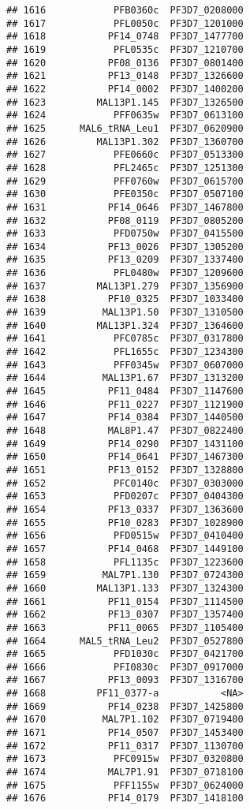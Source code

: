 \documentclass[12pt, a4paper]{article}\usepackage[]{graphicx}\usepackage[]{color}
\makeatletter
\newenvironment{kframe}{%
 \def\at@end@of@kframe{}%
 \ifinner\ifhmode%
  \def\at@end@of@kframe{\end{minipage}}%
  \begin{minipage}{\columnwidth}%
 \fi\fi%
 \def\FrameCommand##1{\hskip\@totalleftmargin \hskip-\fboxsep
 \colorbox{shadecolor}{##1}\hskip-\fboxsep
     \hskip-\linewidth \hskip-\@totalleftmargin \hskip\columnwidth}%
 \MakeFramed {\advance\hsize-\width
   \@totalleftmargin\z@ \linewidth\hsize
   \@setminipage}}%
 {\par\unskip\endMakeFramed%
 \at@end@of@kframe}
\newenvironment{knitrout}{}{} %
\makeatother
\begin{document}
\begin{knitrout}
\begin{kframe}
\begin{verbatim}
## 1616            PFB0360c  PF3D7_0208000
## 1617            PFL0050c  PF3D7_1201000
## 1618           PF14_0748  PF3D7_1477700
## 1619            PFL0535c  PF3D7_1210700
## 1620           PF08_0136  PF3D7_0801400
## 1621           PF13_0148  PF3D7_1326600
## 1622           PF14_0002  PF3D7_1400200
## 1623         MAL13P1.145  PF3D7_1326500
## 1624            PFF0635w  PF3D7_0613100
## 1625      MAL6_tRNA_Leu1  PF3D7_0620900
## 1626         MAL13P1.302  PF3D7_1360700
## 1627            PFE0660c  PF3D7_0513300
## 1628            PFL2465c  PF3D7_1251300
## 1629            PFF0760w  PF3D7_0615700
## 1630            PFE0350c  PF3D7_0507100
## 1631           PF14_0646  PF3D7_1467800
## 1632           PF08_0119  PF3D7_0805200
## 1633            PFD0750w  PF3D7_0415500
## 1634           PF13_0026  PF3D7_1305200
## 1635           PF13_0209  PF3D7_1337400
## 1636            PFL0480w  PF3D7_1209600
## 1637         MAL13P1.279  PF3D7_1356900
## 1638           PF10_0325  PF3D7_1033400
## 1639          MAL13P1.50  PF3D7_1310500
## 1640         MAL13P1.324  PF3D7_1364600
## 1641            PFC0785c  PF3D7_0317800
## 1642            PFL1655c  PF3D7_1234300
## 1643            PFF0345w  PF3D7_0607000
## 1644          MAL13P1.67  PF3D7_1313200
## 1645           PF11_0484  PF3D7_1147600
## 1646           PF11_0227  PF3D7_1121900
## 1647           PF14_0384  PF3D7_1440500
## 1648           MAL8P1.47  PF3D7_0822400
## 1649           PF14_0290  PF3D7_1431100
## 1650           PF14_0641  PF3D7_1467300
## 1651           PF13_0152  PF3D7_1328800
## 1652            PFC0140c  PF3D7_0303000
## 1653            PFD0207c  PF3D7_0404300
## 1654           PF13_0337  PF3D7_1363600
## 1655           PF10_0283  PF3D7_1028900
## 1656            PFD0515w  PF3D7_0410400
## 1657           PF14_0468  PF3D7_1449100
## 1658            PFL1135c  PF3D7_1223600
## 1659          MAL7P1.130  PF3D7_0724300
## 1660         MAL13P1.133  PF3D7_1324300
## 1661           PF11_0154  PF3D7_1114500
## 1662           PF13_0307  PF3D7_1357400
## 1663           PF11_0065  PF3D7_1105400
## 1664      MAL5_tRNA_Leu2  PF3D7_0527800
## 1665            PFD1030c  PF3D7_0421700
## 1666            PFI0830c  PF3D7_0917000
## 1667           PF13_0093  PF3D7_1316700
## 1668         PF11_0377-a           <NA>
## 1669           PF14_0238  PF3D7_1425800
## 1670          MAL7P1.102  PF3D7_0719400
## 1671           PF14_0507  PF3D7_1453400
## 1672           PF11_0317  PF3D7_1130700
## 1673            PFC0915w  PF3D7_0320800
## 1674           MAL7P1.91  PF3D7_0718100
## 1675            PFF1155w  PF3D7_0624000
## 1676           PF14_0179  PF3D7_1418100

\end{verbatim}
\end{kframe}
\end{knitrout}
\end{document}
